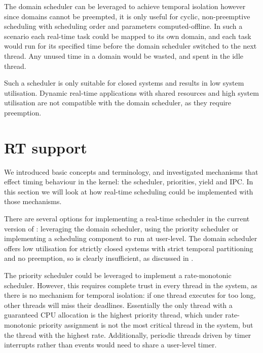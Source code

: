 The domain scheduler can be leveraged to achieve temporal isolation however since domains cannot be
preempted, it is only useful for cyclic, non-preemptive scheduling with scheduling order and
parameters computed-offline.
In such a scenario each real-time task could be mapped to its own domain, and each task would run for its specified time before the domain scheduler switched to the next thread.
Any unused time in a domain would be wasted, and spent in the idle thread.

Such a scheduler is only suitable for closed systems and results in low system utilisation.
Dynamic real-time applications with shared resources and high system utilisation are not compatible
with the domain scheduler, as they require preemption.

\section{RT support}

We introduced basic \selfour concepts and terminology, and investigated mechanisms that effect
timing behaviour in the kernel: the scheduler, priorities, yield and IPC. 
In this section we will look at how real-time scheduling could be implemented with those mechanisms.

There are several options for implementing a real-time scheduler in the current version of \selfour: leveraging the domain scheduler, using the priority scheduler or implementing a scheduling component to run at user-level. 
The domain scheduler offers low utilisation for strictly closed
systems with strict temporal partitioning and no preemption, so is clearly insufficient, as
discussed in .

The priority scheduler could be leveraged to implement a rate-monotonic scheduler.
However, this requires complete trust in every thread in the system, as there is no mechanism for temporal isolation: if one thread executes for too long, other threads will miss their deadlines.
Essentially the only thread with a guaranteed CPU allocation is the highest priority thread, which under rate-monotonic priority assignment is not the most critical thread in the system, but the thread with the highest rate.
Additionally, periodic threads driven by timer interrupts rather than events would need to share a user-level timer.

